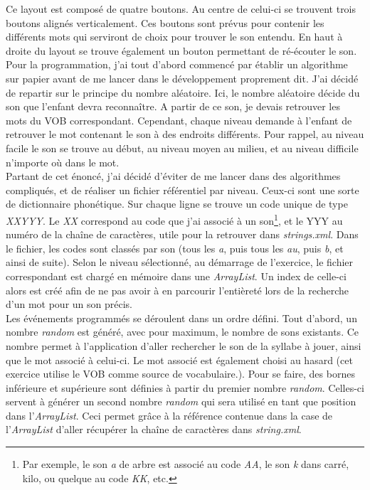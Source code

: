 Ce layout est composé de quatre boutons. Au centre de celui-ci se trouvent trois boutons alignés verticalement. Ces boutons sont prévus pour contenir les différents mots qui serviront de choix pour trouver le son entendu. En haut à droite du layout se trouve également un bouton permettant de ré-écouter le son.\\

Pour la programmation, j'ai tout d'abord commencé par établir un algorithme sur papier avant de me lancer dans le développement proprement dit. J'ai décidé de repartir sur le principe du nombre aléatoire. Ici, le nombre aléatoire décide du son que l'enfant devra reconnaître. A partir de ce son, je devais retrouver les mots du VOB correspondant. Cependant, chaque niveau demande à l'enfant de retrouver le mot contenant le son à des endroits différents. Pour rappel, au niveau facile le son se trouve au début, au niveau moyen au milieu, et au niveau difficile n'importe où dans le mot.\\

Partant de cet énoncé, j'ai décidé d'éviter de me lancer dans des algorithmes compliqués, et de réaliser un fichier référentiel par niveau. Ceux-ci sont une sorte de dictionnaire phonétique. Sur chaque ligne se trouve un code unique de type \textit{XXYYY}. Le \textit{XX} correspond au code que j'ai associé à un son\footnote{Par exemple, le son \textit{a} de arbre est associé au code \textit{AA}, le son \textit{k} dans carré, kilo, ou quelque au code \textit{KK}, etc.}, et le YYY au numéro de la chaîne de caractères, utile pour la retrouver dans \textit{strings.xml}. Dans le fichier, les codes sont classés par son (tous les \textit{a}, puis tous les \textit{au}, puis \textit{b}, et ainsi de suite). Selon le niveau sélectionné, au démarrage de l'exercice, le fichier correspondant est chargé en mémoire dans une \textit{ArrayList}. Un index de celle-ci alors est créé afin de ne pas avoir à en parcourir l'entièreté lors de la recherche d'un mot pour un son précis.\\

Les événements programmés se déroulent dans un ordre défini. Tout d'abord, un nombre \textit{random} est généré, avec pour maximum, le nombre de sons existants. Ce nombre permet à l'application d'aller rechercher le son de la syllabe à jouer, ainsi que le mot associé à celui-ci. Le mot associé est également choisi au hasard (cet exercice utilise le VOB comme source de vocabulaire.). Pour se faire, des bornes inférieure et supérieure sont définies à partir du premier nombre \textit{random}. Celles-ci servent à générer un second nombre \textit{random} qui sera utilisé en tant que position dans l'\textit{ArrayList}. Ceci permet grâce à la référence contenue dans la case de l'\textit{ArrayList} d'aller récupérer la chaîne de caractères dans \textit{string.xml}.\\

